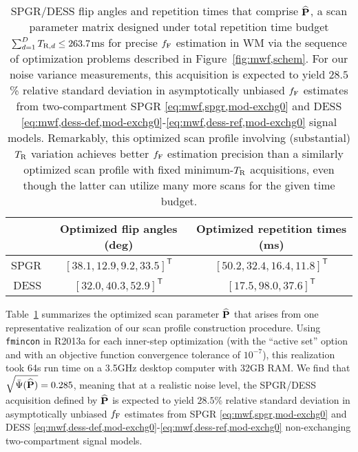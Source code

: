 \begin{table}[!tb]
  \centering
  \begin{tabular}{r | c | c}
    \hline
    \hline
    & Optimized flip angles (deg) & Optimized repetition times (ms) \\
    \hline
    SPGR & $[38.1,12.9,9.2,33.5]^\mathsf{T}$ & $[50.2,32.4,16.4,11.8]^\mathsf{T}$ \\
    DESS & $[32.0,40.3,52.9]^\mathsf{T}$ & $[17.5,98.0,37.6]^\mathsf{T}$ \\
    \hline
    \hline
  \end{tabular}
  \caption{
		SPGR/DESS flip angles and repetition times
		that comprise $\widehat{\mathbf{P}}$,
		a scan parameter matrix designed
		under total repetition time budget 
		$\sum_{d=1}^D T_{\mathrm{R},d} \leq 263.7$ms
		for precise $f_{\mathrm{F}}$ estimation in WM
		via the sequence of optimization problems
		described in Figure~\ref{fig:mwf,schem}. 
		For our noise variance measurements,
		this acquisition is expected
		to yield $28.5$\% relative standard deviation
		in asymptotically unbiased $f_{\mathrm{F}}$ estimates
		from two-compartment
		SPGR \eqref{eq:mwf,spgr,mod-exchg0}
		and DESS \eqref{eq:mwf,dess-def,mod-exchg0}-\eqref{eq:mwf,dess-ref,mod-exchg0}
		signal models.
		Remarkably, 
		this optimized scan profile 
		involving (substantial) $T_\mathrm{R}$ variation
		achieves better $f_{\mathrm{F}}$ estimation precision
		than a similarly optimized scan profile
		with fixed minimum-$T_\mathrm{R}$ acquisitions,
		even though the latter 
		can utilize many more scans 
		for the given time budget.
  }
  \label{tab:mwf,acq}
\end{table}

Table~\ref{tab:mwf,acq} summarizes
the optimized scan parameter $\widehat{\mathbf{P}}$ 
that arises
from one representative realization 
of our scan profile construction procedure.
Using \texttt{fmincon} 
in \matlab R2013a
for each inner-step optimization
(with the ``active set'' option and
with an objective function convergence tolerance of $10^{-7}$),
this realization took 64s run time
on a 3.5GHz desktop computer with 32GB RAM.
We find that $\sqrt{\bar{\Psi}(\widehat{\mathbf{P}})} = 0.285$, 
meaning that at a realistic noise level,
the SPGR/DESS acquisition defined by $\widehat{\mathbf{P}}$
is expected to yield $28.5$\% relative standard deviation
in asymptotically unbiased $f_{\mathrm{F}}$ estimates
from SPGR \eqref{eq:mwf,spgr,mod-exchg0} 
and DESS 
\eqref{eq:mwf,dess-def,mod-exchg0}-\eqref{eq:mwf,dess-ref,mod-exchg0}
non-exchanging two-compartment signal models.

